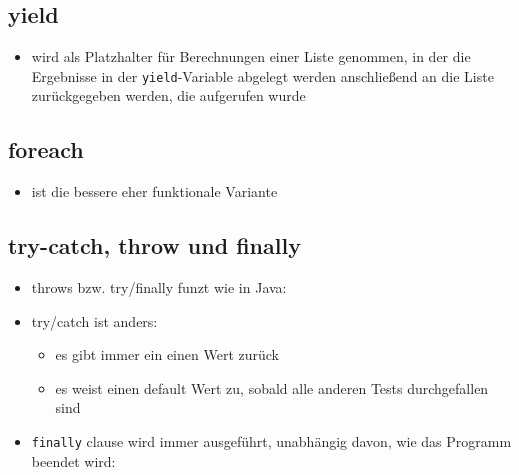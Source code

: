 \subsection{yield}
\begin{itemize}
  \item wird als Platzhalter für Berechnungen einer Liste genommen, in der
  die Ergebnisse in der \texttt{yield}-Variable abgelegt werden \und anschließend
  an die Liste zurückgegeben werden, die aufgerufen wurde
  
  
 
\end{itemize}


\subsection{foreach}
\begin{itemize}
  \item ist die bessere \und eher funktionale Variante 
  
  
\end{itemize}


\subsection{try-catch, throw und finally}
\begin{itemize}
  \item throws bzw. try/finally funzt wie in Java:
  
  
  
  \item try/catch ist anders:
  \begin{itemize}
    \item es gibt immer ein einen Wert zurück
    \item es weist einen default Wert zu, sobald alle anderen Tests
    durchgefallen sind
    
    
    
  \end{itemize}
  \item \texttt{finally} clause wird immer ausgeführt, unabhängig davon,
  wie das Programm beendet wird:
  
  
  
\end{itemize}


